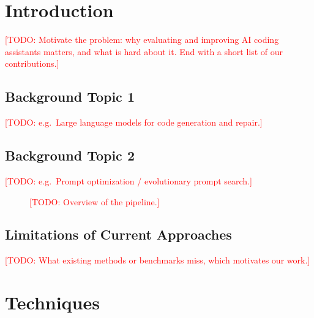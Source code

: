\documentclass[11pt]{article}
\title{\todo{Paper Title}}
\author{
  Luke Wang \and Brandon Romero \and Sabad Modi \and Sophia Zhang \and
  Angela Liu \and Natan Vidra
}
\date{}   %
\newcommand{\todo}[1]{\textcolor{red}{[TODO: #1]}}
\begin{document}
\maketitle

\begin{abstract}
\todo{150--250 words: the problem, what we did, the main result (with numbers),
and why it matters.}
\end{abstract}

\section{Introduction}
\label{sec:intro}

\todo{Motivate the problem: why evaluating and improving AI coding assistants
matters, and what is hard about it. End with a short list of our contributions.}

\subsection{Background Topic 1}
\label{sec:intro-bg1}
\todo{e.g.\ Large language models for code generation and repair.}

\subsection{Background Topic 2}
\label{sec:intro-bg2}
\todo{e.g.\ Prompt optimization / evolutionary prompt search.}

\begin{figure}[ht]
  \centering
  \caption{\todo{Overview of the pipeline.}}
  \label{fig:pipeline}
\end{figure}

\subsection{Limitations of Current Approaches}
\label{sec:intro-limits}
\todo{What existing methods or benchmarks miss, which motivates our work.}

\section{Techniques}
\label{sec:techniques}
\end{document}
